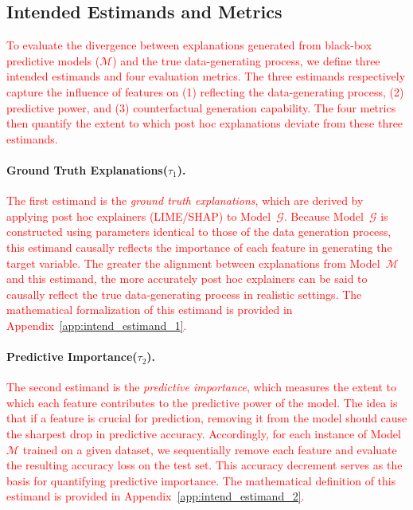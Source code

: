 \documentclass[mnsc,blindrev]{informs3}
\begin{document}
\subsection{Intended Estimands and Metrics}
\label{sec:intended_estimands_and_metrics}

\textcolor{red}{To evaluate the divergence between explanations generated from black-box predictive models ($\mathcal{M}$) and the true data-generating process, we define three intended estimands and four evaluation metrics. The three estimands respectively capture the influence of features on (1) reflecting the data-generating process, (2) predictive power, and (3) counterfactual generation capability. The four metrics then quantify the extent to which post hoc explanations deviate from these three estimands.}

\paragraph{Ground Truth Explanations($\tau_1$).}  
\textcolor{red}{The first estimand is the \textit{ground truth explanations}, which are derived by applying post hoc explainers (LIME/SHAP) to Model~$\mathcal{G}$. Because Model~$\mathcal{G}$ is constructed using parameters identical to those of the data generation process, this estimand causally reflects the importance of each feature in generating the target variable. The greater the alignment between explanations from Model~$\mathcal{M}$ and this estimand, the more accurately post hoc explainers can be said to causally reflect the true data-generating process in realistic settings. The mathematical formalization of this estimand is provided in Appendix~\ref{app:intend_estimand_1}.}

\paragraph{Predictive Importance($\tau_2$).}  
\textcolor{red}{The second estimand is the \textit{predictive importance}, which measures the extent to which each feature contributes to the predictive power of the model. The idea is that if a feature is crucial for prediction, removing it from the model should cause the sharpest drop in predictive accuracy. Accordingly, for each instance of Model~$\mathcal{M}$ trained on a given dataset, we sequentially remove each feature and evaluate the resulting accuracy loss on the test set. This accuracy decrement serves as the basis for quantifying predictive importance. The mathematical definition of this estimand is provided in Appendix~\ref{app:intend_estimand_2}.}
\end{document}
